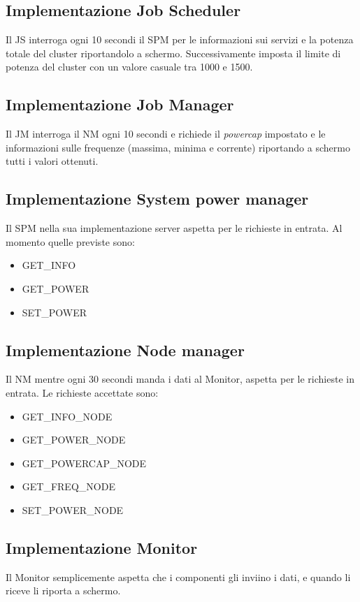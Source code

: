 \subsection*{Implementazione Job Scheduler}
Il JS interroga ogni 10 secondi il SPM per le informazioni sui servizi e la potenza totale del cluster riportandolo a schermo. Successivamente  imposta il limite di potenza del cluster con un valore casuale tra 1000 e 1500.

\subsection*{Implementazione Job Manager}
Il JM interroga il NM ogni 10 secondi e richiede il \emph{powercap} impostato e le informazioni sulle frequenze (massima, minima e corrente) riportando a schermo tutti i valori ottenuti.

\subsection*{Implementazione System power manager}
Il SPM nella sua implementazione server aspetta per le richieste in entrata. Al momento quelle previste sono:
\begin{itemize}
    \item GET\_INFO
    \item GET\_POWER
    \item SET\_POWER
\end{itemize}

\subsection*{Implementazione Node manager}
Il NM mentre ogni 30 secondi manda i dati al Monitor, aspetta per le richieste in entrata. Le richieste accettate sono:
\begin{itemize}
    \item GET\_INFO\_NODE
    \item GET\_POWER\_NODE
    \item GET\_POWERCAP\_NODE 
    \item GET\_FREQ\_NODE   
    \item SET\_POWER\_NODE
\end{itemize}

\subsection*{Implementazione Monitor}
Il Monitor semplicemente aspetta che i componenti gli inviino i dati, e quando li riceve li riporta a schermo.

